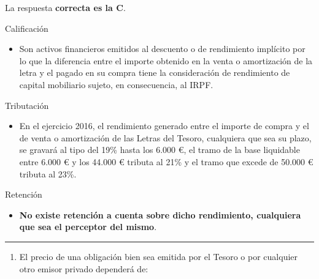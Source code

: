 \documentclass[
  letterpaper,
  DIV=11,
  numbers=noendperiod]{scrreprt}
\providecommand{\tightlist}{%
  \setlength{\itemsep}{0pt}\setlength{\parskip}{0pt}}\usepackage{longtable,booktabs,array}
\begin{document}
\begin{tcolorbox}[enhanced jigsaw, left=2mm, opacityback=0, colback=white, breakable, arc=.35mm, bottomrule=.15mm, rightrule=.15mm, toprule=.15mm, leftrule=.75mm, colframe=quarto-callout-tip-color-frame]
\begin{minipage}[t]{5.5mm}
\textcolor{quarto-callout-tip-color}{\faLightbulb}
\end{minipage}%
\begin{minipage}[t]{\textwidth - 5.5mm}

La respuesta \textbf{correcta es la C}.

Calificación

\begin{itemize}
\tightlist
\item
  Son activos financieros emitidos al descuento o de rendimiento
  implícito por lo que la diferencia entre el importe obtenido en la
  venta o amortización de la letra y el pagado en su compra tiene la
  consideración de rendimiento de capital mobiliario sujeto, en
  consecuencia, al IRPF.
\end{itemize}

Tributación

\begin{itemize}
\tightlist
\item
  En el ejercicio 2016, el rendimiento generado entre el importe de
  compra y el de venta o amortización de las Letras del Tesoro,
  cualquiera que sea su plazo, se gravará al tipo del 19\% hasta los
  6.000 €, el tramo de la base liquidable entre 6.000 € y los 44.000 €
  tributa al 21\% y el tramo que excede de 50.000 € tributa al 23\%.
\end{itemize}

Retención

\begin{itemize}
\tightlist
\item
  \textbf{No existe retención a cuenta sobre dicho rendimiento,
  cualquiera que sea el perceptor del mismo}.
\end{itemize}

\end{minipage}%
\end{tcolorbox}

\begin{center}\rule{0.5\linewidth}{0.5pt}\end{center}

\begin{enumerate}
\def\labelenumi{\arabic{enumi}.}
\setcounter{enumi}{65}
\tightlist
\item
  El precio de una obligación bien sea emitida por el Tesoro o por
  cualquier otro emisor privado dependerá de:
\end{enumerate}
\end{document}
